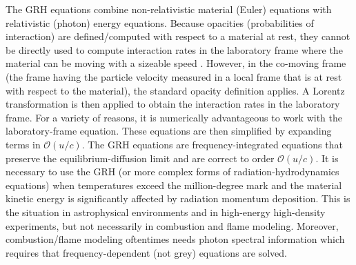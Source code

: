 \documentclass{article}
\newcommand{\grad}{\vec{\nabla}}
\newcommand{\tcr}[1]{\textcolor{red}{#1}}
\begin{document}
The GRH equations combine non-relativistic material (Euler) equations with relativistic (photon) energy equations. Because opacities (probabilities of interaction) are defined/computed with respect to a material at rest, they cannot be directly used to compute interaction rates in the laboratory frame where the material can be moving with a sizeable speed \cite{castor,mihalas}. However, in the co-moving frame (the frame having the particle velocity measured in a local frame that is at rest with respect to the material), the standard opacity definition applies. A Lorentz transformation is then applied to obtain the interaction rates in the laboratory frame.  For a variety of reasons, it is numerically advantageous to work with the laboratory-frame equation. These equations are then simplified by expanding terms in $\mathcal{O}(u/c)$. The GRH equations are frequency-integrated 
equations that preserve the equilibrium-diffusion limit and are correct to order $\mathcal{O}(u/c)$.
It is necessary to use the GRH (or more complex forms of radiation-hydrodynamics equations) 
when temperatures exceed the million-degree mark and the material kinetic energy is significantly affected 
by radiation momentum deposition. This is the situation in astrophysical environments and in high-energy high-density experiments, but not necessarily 
in combustion and flame modeling. Moreover, combustion/flame modeling oftentimes needs photon spectral information which requires that frequency-dependent (not grey) 
equations are solved.
\end{document}
